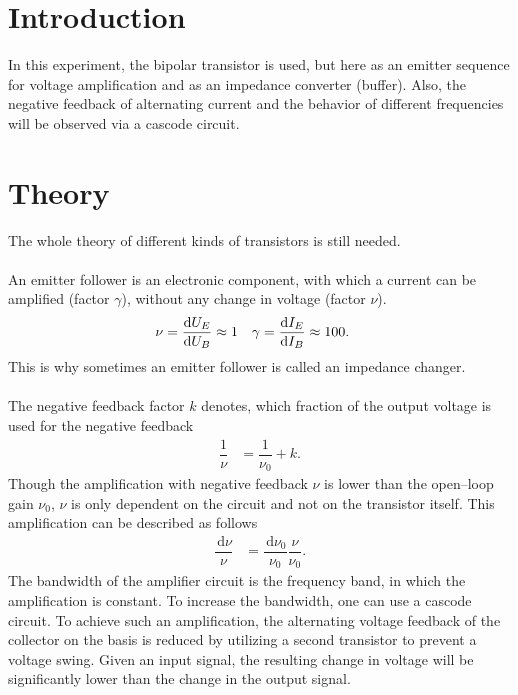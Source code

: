 \documentclass[a4paper,10pt]{article}
\newcommand{\td}{\,\text{d}}
\numberwithin{equation}{section}
\begin{document}
\begin{multicols}{2}
	\sloppy
	\section{Introduction}
	In this experiment, the bipolar transistor is used, but here as an emitter sequence for voltage amplification and as an impedance converter (buffer).
	Also, the negative feedback of alternating current and the behavior of different frequencies will be observed via a cascode circuit.

        \section{Theory}
        The whole theory of different kinds of transistors is still needed.
        \\\\An emitter follower is an electronic component, with which a current can be amplified (factor $\gamma $), without any change in voltage (factor $\nu $).
        \begin{align} 
                \nu  &= \diff[]{U_E}{U_B}\approx 1 & \gamma &= \diff[]{I_E}{I_B}\approx 100
        .\end{align} 
        This is why sometimes an emitter follower is called an impedance changer.
        \\\\ The negative feedback factor $k$ denotes, which fraction of the output voltage is used for the negative feedback
        \begin{align} 
                \dfrac{1}{\nu } &= \dfrac{1}{\nu _0}+k
        .\end{align} 
        Though the amplification with negative feedback $\nu $ is lower than the open--loop gain $\nu _0$, $\nu $ is only dependent on the circuit and not on the transistor itself.
        This amplification can be described as follows
        \begin{align} 
                \dfrac{\td \nu }{\nu } &= \dfrac{\td \nu _0}{\nu _0}\dfrac{\nu }{\nu _0}
        .\end{align} 
        The bandwidth of the amplifier circuit is the frequency band, in which the amplification is constant.
        To increase the bandwidth, one can use a cascode circuit.
        To achieve such an amplification, the alternating voltage feedback of the collector on the basis is reduced by utilizing a second transistor to prevent a voltage swing.
        Given an input signal, the resulting change in voltage will be significantly lower than the change in the output signal.

\end{multicols}
\end{document}
